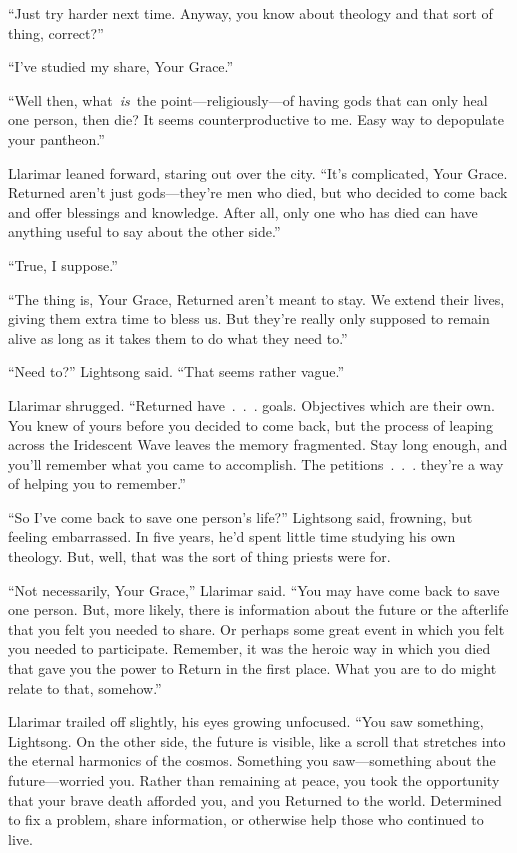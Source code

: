 “Just try harder next time. Anyway, you know about theology and that sort of thing, correct?”

“I’ve studied my share, Your Grace.”

“Well then, what~\textit{is}~the point—religiously—of having gods that can only heal one person, then die? It seems counterproductive to me. Easy way to depopulate your pantheon.”

Llarimar leaned forward, staring out over the city. “It’s complicated, Your Grace. Returned aren’t just gods—they’re men who died, but who decided to come back and offer blessings and knowledge. After all, only one who has died can have anything useful to say about the other side.”

“True, I suppose.”

“The thing is, Your Grace, Returned aren’t meant to stay. We extend their lives, giving them extra time to bless us. But they’re really only supposed to remain alive as long as it takes them to do what they need to.”

“Need to?” Lightsong said. “That seems rather vague.”

Llarimar shrugged. “Returned have~.~.~. goals. Objectives which are their own. You knew of yours before you decided to come back, but the process of leaping across the Iridescent Wave leaves the memory fragmented. Stay long enough, and you’ll remember what you came to accomplish. The petitions~.~.~. they’re a way of helping you to remember.”

“So I’ve come back to save one person’s life?” Lightsong said, frowning, but feeling embarrassed. In five years, he’d spent little time studying his own theology. But, well, that was the sort of thing priests were for.

“Not necessarily, Your Grace,” Llarimar said. “You may have come back to save one person. But, more likely, there is information about the future or the afterlife that you felt you needed to share. Or perhaps some great event in which you felt you needed to participate. Remember, it was the heroic way in which you died that gave you the power to Return in the first place. What you are to do might relate to that, somehow.”

Llarimar trailed off slightly, his eyes growing unfocused. “You saw something, Lightsong. On the other side, the future is visible, like a scroll that stretches into the eternal harmonics of the cosmos. Something you saw—something about the future—worried you. Rather than remaining at peace, you took the opportunity that your brave death afforded you, and you Returned to the world. Determined to fix a problem, share information, or otherwise help those who continued to live.

